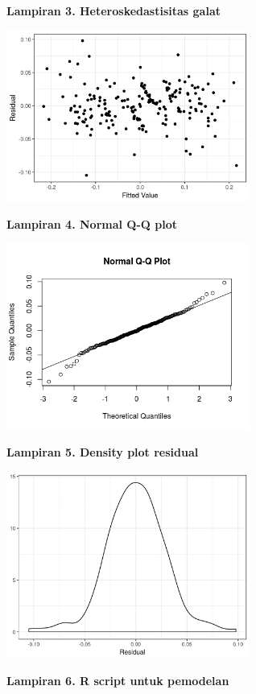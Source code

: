 \newpage
\textbf{Lampiran 3. Heteroskedastisitas galat}

\includegraphics[width = 0.6\textwidth]{img/hetero.png}

\textbf{Lampiran 4. Normal Q-Q plot}

\includegraphics[width = 0.6\textwidth]{img/normal-qqplot.png}

\textbf{Lampiran 5. Density plot residual}

\includegraphics[width = 0.6\textwidth]{img/galat-density.png}

\textbf{Lampiran 6. R script untuk pemodelan}

